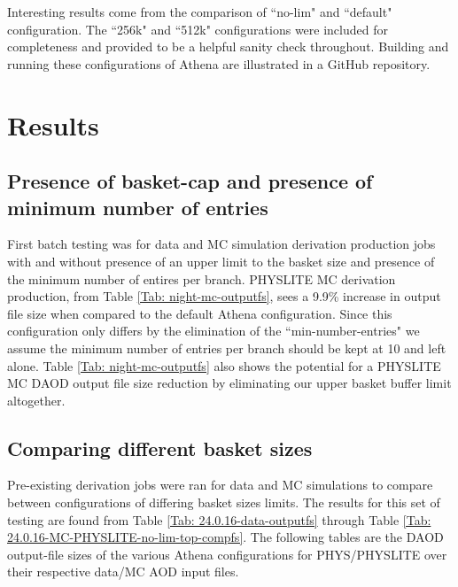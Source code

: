 Interesting results come from the comparison of ``no-lim" and ``default" configuration. The ``256k" and ``512k" configurations were included for completeness and provided to be a helpful sanity check throughout. 
Building and running these configurations of Athena are illustrated in a GitHub repository. \cite{Kraus}

\section{Results}
\label{sec:DAODProd_Results}

\subsection{Presence of basket-cap and presence of minimum number of entries}
\label{sec:DAODProd_Results_presence}


First batch testing was for data and MC simulation derivation production jobs with and without presence of an upper limit to the basket size and presence of the minimum number of entires per branch. 
PHYSLITE MC derivation production, from Table \ref{Tab: night-mc-outputfs}, sees a 9.9\% increase in output file size when compared to the default Athena configuration. 
Since this configuration only differs by the elimination of the ``min-number-entries" we assume the minimum number of entries per branch should be kept at 10 and left alone. 
Table \ref{Tab: night-mc-outputfs} also shows the potential for a PHYSLITE MC DAOD output file size reduction by eliminating our upper basket buffer limit altogether.  



\subsection{Comparing different basket sizes}
\label{sec:DAODProd_Results_comparing}

Pre-existing derivation jobs were ran for data and MC simulations to compare between configurations of differing basket sizes limits. 
The results for this set of testing are found from Table \ref{Tab: 24.0.16-data-outputfs} through Table \ref{Tab: 24.0.16-MC-PHYSLITE-no-lim-top-compfs}. 
The following tables are the DAOD output-file sizes of the various Athena configurations for PHYS/PHYSLITE over their respective data/MC AOD input files. 




